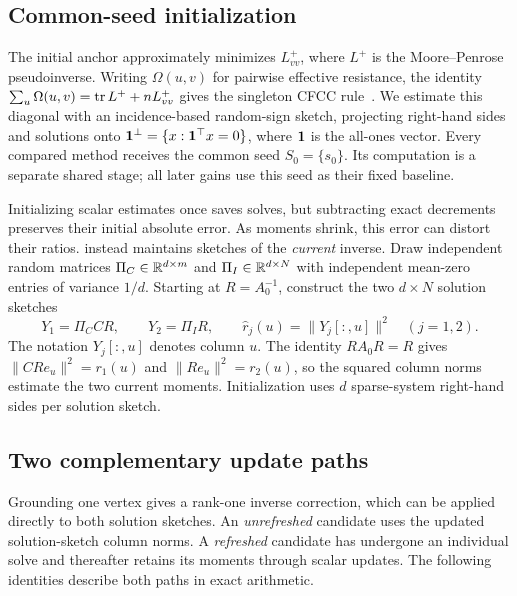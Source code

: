\subsection{Common-seed initialization}
The initial anchor approximately minimizes $L^+_{vv}$, where $L^+$
is the Moore--Penrose pseudoinverse. Writing $\Omega(u,v)$ for
pairwise effective resistance, the identity
$\sum_u\Omega(u,v)=\operatorname{tr} L^++nL^+_{vv}$ gives the singleton
CFCC rule~\cite{li2019,xia2025}. We estimate this diagonal with
an incidence-based random-sign sketch, projecting right-hand sides
and solutions onto $\mathbf 1^\perp=\{x:\mathbf 1^\top x=0\}$, where
$\mathbf 1$ is the all-ones vector. Every compared method receives the
common seed $S_0=\{s_0\}$. Its computation is a separate shared
stage; all later gains use this seed as their fixed baseline.

Initializing scalar estimates once saves solves, but subtracting exact
decrements preserves their initial absolute error. As moments shrink,
this error can distort their ratios. \alg{} instead maintains
sketches of the \emph{current} inverse. Draw independent random
matrices $\Pi_C\in\mathbb R^{d\times m}$ and $\Pi_I\in\mathbb R^{d\times N}$ with
independent mean-zero entries of variance $1/d$. Starting at
$R=A_0^{-1}$, construct the two $d\times N$ solution sketches
\begin{equation}\label{eq:banks}
 Y_1=\Pi_C C R,\qquad Y_2=\Pi_I R,\qquad
 \widehat r_j(u)=\|Y_j[:,u]\|^2\quad(j=1,2).
\end{equation}
The notation $Y_j[:,u]$ denotes column $u$. The identity $RA_0R=R$
gives $\|CRe_u\|^2=r_1(u)$ and $\|Re_u\|^2=r_2(u)$, so the
squared column norms estimate the two current moments.
Initialization uses $d$ sparse-system right-hand sides per solution sketch.

\subsection{Two complementary update paths}
Grounding one vertex gives a rank-one inverse correction, which can
be applied directly to both solution sketches. An \emph{unrefreshed} candidate
uses the updated solution-sketch column norms. A \emph{refreshed}
candidate has undergone an individual solve and thereafter retains
its moments through scalar updates. The following identities describe
both paths in exact arithmetic.

